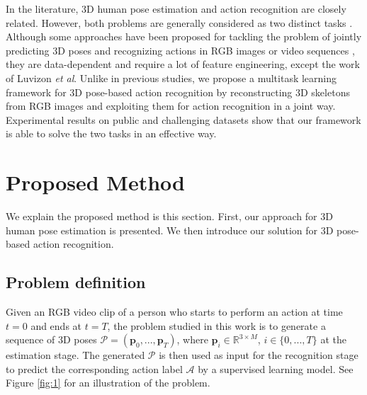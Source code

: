 \documentclass{bmvc2k}
\def\etal{\emph{et al}\bmvaOneDot}
\begin{document}
In the literature, 3D human pose estimation and action recognition are closely related. However, both problems are generally considered as two distinct tasks \cite{cheronICCV15}. Although some approaches have been proposed for tackling the problem of jointly predicting 3D poses and recognizing actions in RGB images or video sequences \cite{5540235,7298734,luvizon20182d}, they are data-dependent and require a lot of feature engineering, except the work of Luvizon \etal \cite{luvizon20182d}. Unlike in previous studies, we propose a multitask learning framework for 3D pose-based action recognition by reconstructing 3D skeletons from RGB images and exploiting them for action recognition in a joint way. Experimental results on public and challenging datasets show that our framework is able to solve the two tasks in an effective way. \\[-0.8cm]
\section{Proposed Method\\[-0.2cm]} \label{sect:3}
We explain the proposed method is this section. First, our approach for 3D human pose estimation is presented. We then introduce our solution for 3D pose-based action recognition. \\[-0.8cm]
\subsection{Problem definition \\[-0.1cm]}
Given an RGB video clip of a person who starts to perform an action at time $t = 0$ and ends at $t = T$, the problem studied in this work is to generate a sequence of 3D poses $\mathcal{P} = (\textbf{p}_0, ..., \textbf{p}_T)$, where $\textbf{p}_i \in \mathbb{R}^{3 \times M}$, $i \in \{0, ..., T\}$ at the estimation stage. The generated $\mathcal{P}$ is then used as input for the recognition stage to predict the corresponding action label $\mathcal{A}$ by a supervised learning model. See Figure \ref{fig:1} for an illustration of the problem. \\[-0.8cm]
\end{document}
